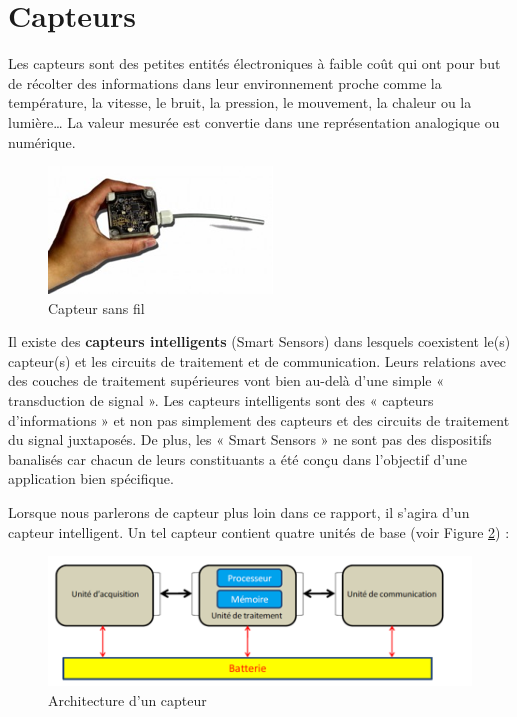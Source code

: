 \section{Capteurs}

Les capteurs sont des petites entités électroniques à faible coût qui ont pour but de récolter des informations dans leur environnement proche comme la température, la vitesse, le bruit, la pression, le mouvement, la chaleur ou la lumière… La valeur mesurée est convertie dans une représentation analogique ou numérique.

\begin{figure}[h]
\centering
\includegraphics[scale=0.8]{intro/imageCapteur}
\caption{\label{imageCapteur} Capteur sans fil}
\end{figure}

Il existe des \textbf{capteurs intelligents} (Smart Sensors) dans lesquels coexistent le(s) capteur(s) et les circuits de traitement et de communication. Leurs relations avec des couches de traitement supérieures vont bien au-delà d’une simple « transduction de signal ». Les capteurs intelligents sont des « capteurs d’informations » et non pas simplement des capteurs et des circuits de traitement du signal juxtaposés. De plus, les « Smart Sensors » ne sont pas des dispositifs banalisés car chacun de leurs constituants a été conçu dans l’objectif d’une application bien spécifique.

Lorsque nous parlerons de capteur plus loin dans ce rapport, il s'agira d'un capteur intelligent. Un tel capteur contient quatre unités de base (voir Figure \ref{archiCapteur}) : 
 
 \begin{figure}[h]
\centering
\includegraphics[scale=0.8]{intro/archiCapteur}
\caption{\label{archiCapteur} Architecture d’un capteur}
\end{figure}
 
